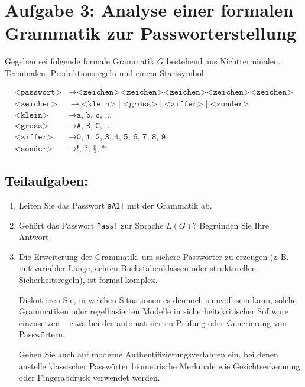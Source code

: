 \documentclass[a4paper,12pt]{article}
\begin{document}
\section*{Aufgabe 3: Analyse einer formalen Grammatik zur Passworterstellung}

Gegeben sei folgende formale Grammatik \( G \) bestehend aus Nichtterminalen, Terminalen,
Produktionsregeln und einem Startsymbol:

	\[
	\begin{aligned}
		\texttt{<passwort>} &\rightarrow \texttt{<zeichen><zeichen><zeichen><zeichen><zeichen>} \\
		\texttt{<zeichen>} &\rightarrow \texttt{<klein>} \mid \texttt{<gross>} \mid \texttt{<ziffer>} \mid \texttt{<sonder>} \\
		\texttt{<klein>} &\rightarrow \texttt{a, b, c, ...} \\
		\texttt{<gross>} &\rightarrow \texttt{A, B, C, ...} \\
		\texttt{<ziffer>} &\rightarrow \texttt{0, 1, 2, 3, 4, 5, 6, 7, 8, 9} \\
		\texttt{<sonder>} &\rightarrow \texttt{!, ?, §, *}
	\end{aligned}
	\]

\subsection*{Teilaufgaben:}

\begin{enumerate}
	\item Leiten Sie das Passwort \texttt{aA1!} mit der Grammatik ab.
	
	\item Gehört das Passwort \texttt{Pass!} zur Sprache \( L(G) \)? Begründen Sie Ihre Antwort.
	
	\item Die Erweiterung der Grammatik, um sichere Passwörter zu erzeugen (z.\,B. mit variabler Länge, echten Buchstabenklassen oder strukturellen Sicherheitsregeln), ist formal komplex.  

Diskutieren Sie, in welchen Situationen es dennoch sinnvoll sein kann, solche Grammatiken oder regelbasierten Modelle in sicherheitskritischer Software einzusetzen – etwa bei der automatisierten Prüfung oder Generierung von Passwörtern.

Gehen Sie auch auf moderne Authentifizierungsverfahren ein, bei denen anstelle klassischer Passwörter biometrische Merkmale wie Gesichtserkennung oder Fingerabdruck verwendet werden.
\end{enumerate}
\end{document}
